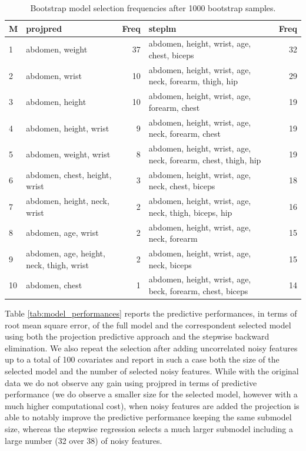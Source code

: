\documentclass[american,]{article}
\theoremstyle{definition}
\begin{document}
\begin{table}[tp]
\scriptsize
\centering
\begin{tabular}{l||l|r||l|r}
  \hline
M & projpred & Freq & steplm & Freq  \\ 
  \hline
1 & abdomen, weight & 37 & abdomen, height, wrist, age, chest, biceps & 32 \\
2 & abdomen, wrist & 10 & abdomen, height, wrist, age, neck, forearm, thigh, hip & 29 \\
3 & abdomen, height & 10 & abdomen, height, wrist, age, forearm, chest & 19 \\
4 & abdomen, height, wrist & 9 & abdomen, height, wrist, age, neck, forearm, chest & 19 \\
5 & abdomen, weight, wrist & 8 & abdomen, height, wrist, age, neck, forearm, chest, thigh, hip & 19 \\
6 & abdomen, chest, height, wrist & 3 & abdomen, height, wrist, age, neck, chest, biceps & 18 \\
7 & abdomen, height, neck, wrist & 2 & abdomen, height, wrist, age, neck, thigh, biceps, hip & 16 \\
8 & abdomen, age, wrist & 2 & abdomen, height, wrist, age, neck, forearm & 15 \\
9 & abdomen, age, height, neck, thigh, wrist & 2 & abdomen, height, wrist, age, neck, biceps & 15 \\
10 & abdomen, chest & 1 & abdomen, height, wrist, age, beck, forearm, chest, biceps & 14 \\
   \hline
\end{tabular}
\caption{Bootstrap model selection frequencies after 1000 bootstrap samples.}
\label{tab:model_frequencies}
\end{table}

Table \ref{tab:model_performances} reports the predictive performances, in terms of root mean square error, of the full model and the correspondent selected model using both the projection predictive approach and the stepwise backward elimination. We also repeat the selection after adding uncorrelated noisy features up to a total of 100 covariates and report in such a case both the size of the selected model and the number of selected noisy features. While with the original data we do not observe any gain using projpred in terms of predictive performance (we do observe a smaller size for the selected model, however with a much higher computational cost), when noisy features are added the projection is able to notably improve the predictive performance keeping the same submodel size, whereas the stepwise regression selects a much larger submodel including a large number (32 over 38) of noisy features.
\end{document}
